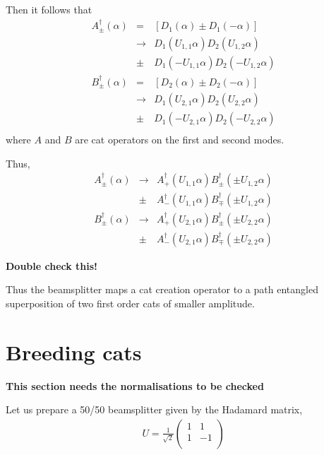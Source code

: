 \documentclass[aps,prl,twocolumn,amsmath,amssymb,nofootinbib,superscriptaddress]{revtex4}
\begin{document}
Then it follows that
\begin{eqnarray}
A_\pm^\dag(\alpha) &=& [D_1(\alpha)\pm D_1(-\alpha)] \nonumber \\
&\to& D_1(U_{1,1}\alpha)D_2(U_{1,2}\alpha)\nonumber\\
&\pm& D_1(-U_{1,1}\alpha)D_2(-U_{1,2}\alpha) \nonumber \\
B_\pm^\dag(\alpha) &=& [D_2(\alpha)\pm D_2(-\alpha)] \nonumber \\
&\to& D_1(U_{2,1}\alpha)D_2(U_{2,2}\alpha)\nonumber\\
&\pm& D_1(-U_{2,1}\alpha)D_2(-U_{2,2}\alpha) \nonumber \\
\end{eqnarray}
where $A$ and $B$ are cat operators on the first and second modes.

Thus,
\begin{eqnarray}
A_\pm^\dag(\alpha) &\to& A_+^\dag(U_{1,1} \alpha) B_\pm^\dag(\pm U_{1,2} \alpha) \nonumber\\
&\pm& A_-^\dag(U_{1,1} \alpha)B_\mp^\dag(\pm U_{1,2} \alpha) \nonumber \\
B_\pm^\dag(\alpha) &\to& A_+^\dag(U_{2,1} \alpha) B_\pm^\dag(\pm U_{2,2} \alpha) \nonumber\\
&\pm& A_-^\dag(U_{2,1} \alpha)B_\mp^\dag(\pm U_{2,2} \alpha)
\end{eqnarray}

\textbf{Double check this!}

Thus the beamsplitter maps a cat creation operator to a path entangled superposition of two first order cats of smaller amplitude.

\section{Breeding cats}

\textbf{This section needs the normalisations to be checked}

Let us prepare a 50/50 beamsplitter given by the Hadamard matrix,
\begin{eqnarray}
U = \frac{1}{\sqrt{2}} \left( \begin{array}{cc}
1 & 1 \\
1 & -1 \\
\end{array} \right)
\end{eqnarray}
\end{document}
